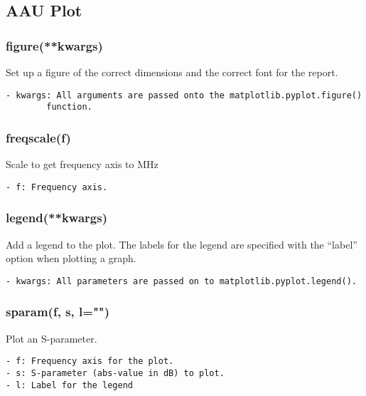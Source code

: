 \subsection{AAU Plot}
\subsubsection{figure(**kwargs)}
Set up a figure of the correct dimensions and the correct font for the
report.

\begin{verbatim}
- kwargs: All arguments are passed onto the matplotlib.pyplot.figure()
        function.
\end{verbatim}

\subsubsection{freqscale(f)}
Scale to get frequency axis to MHz

\begin{verbatim}
- f: Frequency axis.
\end{verbatim}

\subsubsection{legend(**kwargs)}
Add a legend to the plot. The labels for the legend are specified with the
``label'' option when plotting a graph.

\begin{verbatim}
- kwargs: All parameters are passed on to matplotlib.pyplot.legend().
\end{verbatim}

\subsubsection{sparam(f, s, l="")}
Plot an S-parameter.

\begin{verbatim}
- f: Frequency axis for the plot.
- s: S-parameter (abs-value in dB) to plot.
- l: Label for the legend
\end{verbatim}

